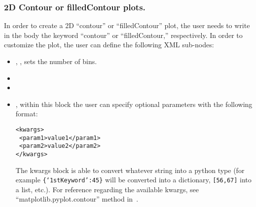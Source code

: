 \subsubsection{2D Contour or filledContour plots.}
In order to create a 2D ``contour'' or ``filledContour'' plot, the user needs to
write in the  body the keyword ``contour'' or ``filledContour,''
respectively.
%
In order to customize the plot, the user can define the following XML sub-nodes:
\begin{itemize}
  \item {}, , sets the 
  number of bins.
  \item {}
  \item {}
  \item {}, within this block the user can specify optional
  parameters with the following format:

\begin{lstlisting}[style=XML]
<kwargs>
 <param1>value1</param1>
 <param2>value2</param2>
</kwargs>
\end{lstlisting}

    The kwargs block is able to convert whatever string into a python type (for
    example \texttt{\{`1stKeyword':45\}} will
    be converted into a dictionary, 
    \texttt{[56,67]} into a list, etc.).
  For reference regarding the available kwargs, see
  ``matplotlib.pyplot.contour'' method in~\cite{MatPlotLib}.
    \end{itemize}

